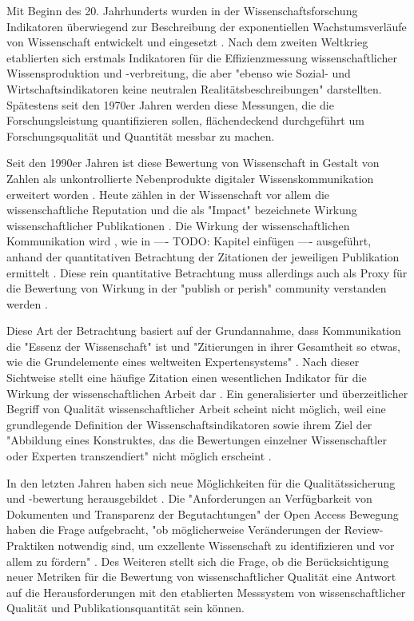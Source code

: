 Mit Beginn des 20. Jahrhunderts wurden in der Wissenschaftsforschung Indikatoren überwiegend zur Beschreibung der exponentiellen Wachstumsverläufe von Wissenschaft entwickelt und eingesetzt \cite{Hornbostel_1997}. Nach dem zweiten Weltkrieg etablierten sich erstmals Indikatoren für die Effizienzmessung wissenschaftlicher Wissensproduktion und -verbreitung, die aber "ebenso wie Sozial- und Wirtschaftsindikatoren keine neutralen Realitätsbeschreibungen" \cite{Hornbostel_1997} darstellten. Spätestens seit den 1970er Jahren werden diese Messungen, die die Forschungsleistung quantifizieren sollen, flächendeckend durchgeführt \cite{Hornbostel_1997} um Forschungsqualität und Quantität messbar zu machen.

Seit den 1990er Jahren ist diese Bewertung von Wissenschaft in Gestalt von Zahlen als unkontrollierte Nebenprodukte digitaler Wissenskommunikation erweitert worden \cite{angermueller_2010}. Heute zählen in der Wissenschaft vor allem die wissenschaftliche Reputation und die als "Impact" bezeichnete Wirkung wissenschaftlicher Publikationen \cite{herb_open_2013} \cite{Hornbostel_1997}. Die Wirkung der wissenschaftlichen Kommunikation wird , wie in ---- TODO: Kapitel einfügen ---- ausgeführt, anhand der quantitativen Betrachtung der Zitationen der jeweiligen Publikation ermittelt \cite{Brembs_2013} \cite[:16]{haustein_2012_multidimensional} \cite{weller2011twitter}. Diese rein quantitative Betrachtung muss allerdings auch als Proxy für die Bewertung von Wirkung in der "publish or perish" community verstanden werden \cite{peters_2015_research}.

Diese Art der Betrachtung basiert auf der Grundannahme, dass Kommunikation die "Essenz der Wissenschaft"\cite{bonitz_1998_matthaus} ist und "Zitierungen in ihrer Gesamtheit so etwas, wie die Grundelemente eines weltweiten Expertensystems" \cite{bonitz_1990_sci}. Nach dieser Sichtweise stellt eine häufige Zitation einen wesentlichen Indikator für die Wirkung der wissenschaftlichen Arbeit dar \cite{hamilton_1990_publishing}. Ein generalisierter und überzeitlicher Begriff von Qualität wissenschaftlicher Arbeit scheint nicht möglich, weil eine grundlegende Definition der Wissenschaftsindikatoren sowie ihrem Ziel der "Abbildung eines Konstruktes, das die Bewertungen einzelner Wissenschaftler oder Experten transzendiert" nicht möglich erscheint \cite{Hornbostel_1997}.

In den letzten Jahren haben sich neue Möglichkeiten für die Qualitätssicherung und -bewertung herausgebildet \cite{rekdal_2014_academic}. Die "Anforderungen an Verfügbarkeit von Dokumenten und Transparenz der Begutachtungen" der Open Access Bewegung haben die Frage aufgebracht, "ob möglicherweise Veränderungen der Review-Praktiken notwendig sind, um exzellente Wissenschaft zu identifizieren und vor allem zu fördern" \cite{suchen_Hornbostel_2006}. Des Weiteren stellt sich die Frage, ob die Berücksichtigung neuer Metriken für die Bewertung von wissenschaftlicher Qualität eine Antwort auf die Herausforderungen mit den etablierten Messsystem von wissenschaftlicher Qualität und Publikationsquantität sein können.

